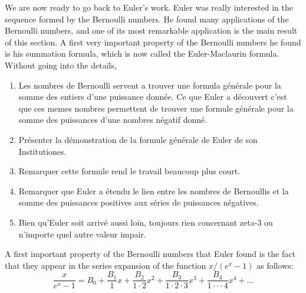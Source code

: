 We are now ready to go back to Euler's work. Euler was really interested in the sequence formed by the Bernoulli numbers. He found many applications of the Bernoulli numbers, and one of its most remarkable application is the main result of this section. A first very important property of the Bernoulli numbers he found is his summation formula, which is now called the Euler-Maclaurin formula. Without going into the details,  

\td 

\begin{enumerate}
    \item Les nombres de Bernoulli servent a trouver une formula générale pour la somme des entiers d'une puissance donnée. Ce que Euler a découvert c'est que ces memes nombres permettent de trouver une formule générale pour la somme des puissances d'une nombres négatif donné. 
    \item Présenter la démonstration de la formule générale de Euler de son Institutiones.
    \item Remarquer cette formule rend le travail beaucoup plus court.
    \item Remarquer que Euler a étendu le lien entre les nombres de Bernoullis et la somme des puissances positives aux séries de puissances négatives.
    \item Bien qu'Euler soit arrivé aussi loin, toujours rien concernant zeta-3 ou n'importe quel autre valeur impair.
\end{enumerate}

\td 

A first important property of the Bernoulli numbers that Euler found  \td is the fact that they appear in the series expansion of the function $x/(e^x - 1)$ as follows:
\begin{equation}
    \frac{x}{e^x - 1} = B_0 + \frac{B_1}{1} x + \frac{B_2}{1\cdot 2}x^2 + \frac{B_3}{1\cdot 2 \cdot 3}x^3 + \frac{B_4}{1\cdot \cdot \cdot 4}x^4 + \dots
\end{equation}

\td 

